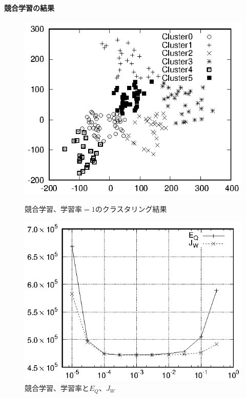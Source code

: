 \documentclass[a4j]{jarticle}
\begin{document}
\paragraph{競合学習の結果}

\begin{figure}[tbp]
 \begin{minipage}{0.5\hsize}
  \begin{center}
   \includegraphics[width=\hsize]{fig/Hokkaido_xyl_compLearn.eps}
  \end{center}
  \caption{競合学習、学習率$=1$のクラスタリング結果}
  \label{fig:compLearn-map}
 \end{minipage}
 \begin{minipage}{0.5\hsize}
  \begin{center}
   \includegraphics[width=\hsize]{fig/compLearn.eps}
  \end{center}
  \caption{競合学習、学習率と$E_Q$、$J_W$}
  \label{fig:compLearn}
 \end{minipage}
\end{figure}
\end{document}
